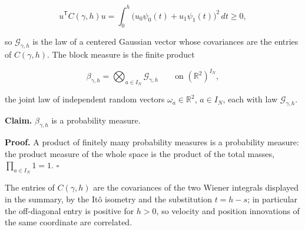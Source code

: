 \documentclass[11pt,a4paper]{report}
\begin{document}
\[u^{\mathsf T}C(\gamma,h)u=\int_0^h\bigl(u_0\psi_0(t)+u_1\psi_1(t)\bigr)^2\,dt\ge0,\]


so \(\mathcal G_{\gamma,h}\) is the law of a centered Gaussian vector whose covariances are the entries of \(C(\gamma,h)\). The block measure is the finite product


\[\beta_{\gamma,h}=\bigotimes_{a\in I_N}\mathcal G_{\gamma,h}\qquad\text{on }(\mathbb R^2)^{I_N},\]


the joint law of independent random vectors \(\omega_a\in\mathbb R^2\), \(a\in I_N\), each with law \(\mathcal G_{\gamma,h}\).




\textbf{Claim.} \(\beta_{\gamma,h}\) is a probability measure.




\textbf{Proof.} A product of finitely many probability measures is a probability measure: the product measure of the whole space is the product of the total masses, \(\prod_{a\in I_N}1=1\). \(\square\)




The entries of \(C(\gamma,h)\) are the covariances of the two Wiener integrals displayed in the summary, by the Itô isometry and the substitution \(t=h-s\); in particular the off-diagonal entry is positive for \(h>0\), so velocity and position innovations of the same coordinate are correlated.
\end{document}
